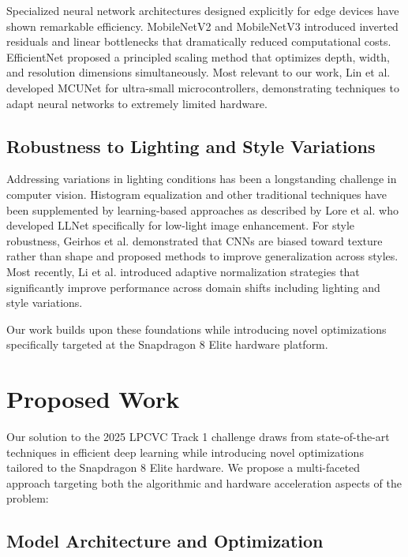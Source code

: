 \documentclass[11pt, oneside]{article}   	%
\begin{document}
Specialized neural network architectures designed explicitly for edge devices have shown remarkable efficiency. MobileNetV2 \cite{sandler2018mobilenetv2} and MobileNetV3 \cite{howard2019searching} introduced inverted residuals and linear bottlenecks that dramatically reduced computational costs. EfficientNet \cite{tan2019efficientnet} proposed a principled scaling method that optimizes depth, width, and resolution dimensions simultaneously. Most relevant to our work, Lin et al. \cite{lin2021mcunet} developed MCUNet for ultra-small microcontrollers, demonstrating techniques to adapt neural networks to extremely limited hardware.

\subsection*{Robustness to Lighting and Style Variations}

Addressing variations in lighting conditions has been a longstanding challenge in computer vision. Histogram equalization and other traditional techniques have been supplemented by learning-based approaches as described by Lore et al. \cite{lore2017llnet} who developed LLNet specifically for low-light image enhancement. For style robustness, Geirhos et al. \cite{geirhos2019imagenet} demonstrated that CNNs are biased toward texture rather than shape and proposed methods to improve generalization across styles. Most recently, Li et al. \cite{li2022domain} introduced adaptive normalization strategies that significantly improve performance across domain shifts including lighting and style variations.

Our work builds upon these foundations while introducing novel optimizations specifically targeted at the Snapdragon 8 Elite hardware platform.

\section*{Proposed Work}

Our solution to the 2025 LPCVC Track 1 challenge draws from state-of-the-art techniques in efficient deep learning while introducing novel optimizations tailored to the Snapdragon 8 Elite hardware. We propose a multi-faceted approach targeting both the algorithmic and hardware acceleration aspects of the problem:

\subsection*{Model Architecture and Optimization}
\end{document}
